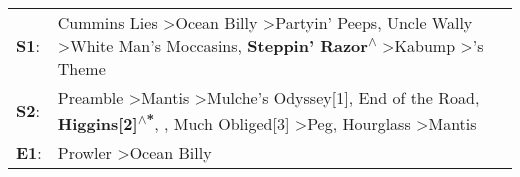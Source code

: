 \begin{supertabular}{p{0.03\textwidth}p{0.92\textwidth}}
 \textbf{S1}:  &                                             Cummins Lies\textsuperscript{} \textgreater \enspace Ocean Billy\textsuperscript{} \textgreater \enspace Partyin' Peeps\textsuperscript{}, \enspace Uncle Wally\textsuperscript{} \textgreater \enspace White Man's Moccasins\textsuperscript{}, \enspace \textbf{Steppin' Razor\textsuperscript{$\wedge$}} \textgreater \enspace Kabump\textsuperscript{} \textgreater {}'s Theme\textsuperscript{}  \enspace  \\
 \textbf{S2}:  &  Preamble\textsuperscript{} \textgreater \enspace Mantis\textsuperscript{} \textgreater \enspace Mulche's Odyssey[1]\textsuperscript{}, \enspace End of the Road\textsuperscript{}, \enspace \textbf{Higgins[2]\textsuperscript{$\wedge$*}}, \textsuperscript{}, \enspace Much Obliged[3]\textsuperscript{} \textgreater \enspace Peg\textsuperscript{}, \enspace Hourglass\textsuperscript{} \textgreater \enspace Mantis\textsuperscript{}  \enspace  \\
 \textbf{E1}:  &                                                                                                                                                                                                                                                                                                                                                                             Prowler\textsuperscript{} \textgreater \enspace Ocean Billy\textsuperscript{}  \enspace  \\
\end{supertabular}
